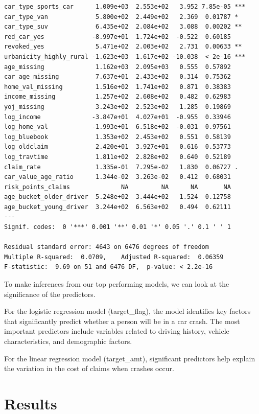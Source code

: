 \documentclass[
  11pt]{article}
\begin{document}
\begin{verbatim}
car_type_sports_car      1.009e+03  2.553e+02   3.952 7.85e-05 ***
car_type_van             5.800e+02  2.449e+02   2.369  0.01787 *  
car_type_suv             6.435e+02  2.084e+02   3.088  0.00202 ** 
red_car_yes             -8.997e+01  1.724e+02  -0.522  0.60185    
revoked_yes              5.471e+02  2.003e+02   2.731  0.00633 ** 
urbanicity_highly_rural -1.623e+03  1.617e+02 -10.038  < 2e-16 ***
age_missing              1.162e+03  2.095e+03   0.555  0.57892    
car_age_missing          7.637e+01  2.433e+02   0.314  0.75362    
home_val_missing         1.516e+02  1.741e+02   0.871  0.38383    
income_missing           1.257e+02  2.608e+02   0.482  0.62983    
yoj_missing              3.243e+02  2.523e+02   1.285  0.19869    
log_income              -3.847e+01  4.027e+01  -0.955  0.33946    
log_home_val            -1.993e+01  6.518e+02  -0.031  0.97561    
log_bluebook             1.353e+02  2.453e+02   0.551  0.58139    
log_oldclaim             2.420e+01  3.927e+01   0.616  0.53773    
log_travtime             1.811e+02  2.828e+02   0.640  0.52189    
claim_rate               1.335e-01  7.295e-02   1.830  0.06727 .  
car_value_age_ratio      1.344e-02  3.263e-02   0.412  0.68031    
risk_points_claims              NA         NA      NA       NA    
age_bucket_older_driver  5.248e+02  3.444e+02   1.524  0.12758    
age_bucket_young_driver  3.244e+02  6.563e+02   0.494  0.62111    
---
Signif. codes:  0 '***' 0.001 '**' 0.01 '*' 0.05 '.' 0.1 ' ' 1

Residual standard error: 4643 on 6476 degrees of freedom
Multiple R-squared:  0.0709,    Adjusted R-squared:  0.06359 
F-statistic:  9.69 on 51 and 6476 DF,  p-value: < 2.2e-16
\end{verbatim}

To make inferences from our top performing models, we can look at the
significance of the predictors.

For the logistic regression model (target\_flag), the model identifies
key factors that significantly predict whether a person will be in a car
crash. The most important predictors include variables related to
driving history, vehicle characteristics, and demographic factors.

For the linear regression model (target\_amt), significant predictors
help explain the variation in the cost of claims when crashes occur.

\section{Results}\label{results}
\end{document}
